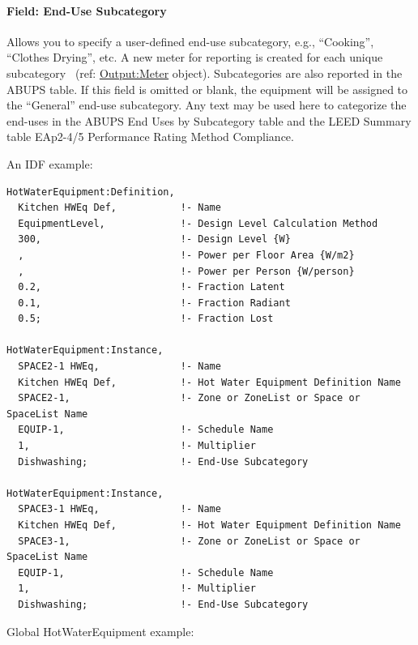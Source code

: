 \paragraph{Field: End-Use Subcategory}\label{field-end-use-subcategory-3-000-hw-instance}

Allows you to specify a user-defined end-use subcategory, e.g., ``Cooking'', ``Clothes Drying'', etc. A new meter for reporting is created for each unique subcategory~ (ref: \hyperref[outputmeter-and-outputmetermeterfileonly]{Output:Meter} object). Subcategories are also reported in the ABUPS table. If this field is omitted or blank, the equipment will be assigned to the ``General'' end-use subcategory. Any text may be used here to categorize the end-uses in the ABUPS End Uses by Subcategory table and the LEED Summary table EAp2-4/5 Performance Rating Method Compliance.

An IDF example:

\begin{lstlisting}
HotWaterEquipment:Definition,
  Kitchen HWEq Def,           !- Name
  EquipmentLevel,             !- Design Level Calculation Method
  300,                        !- Design Level {W}
  ,                           !- Power per Floor Area {W/m2}
  ,                           !- Power per Person {W/person}
  0.2,                        !- Fraction Latent
  0.1,                        !- Fraction Radiant
  0.5;                        !- Fraction Lost

HotWaterEquipment:Instance,
  SPACE2-1 HWEq,              !- Name
  Kitchen HWEq Def,           !- Hot Water Equipment Definition Name
  SPACE2-1,                   !- Zone or ZoneList or Space or SpaceList Name
  EQUIP-1,                    !- Schedule Name
  1,                          !- Multiplier
  Dishwashing;                !- End-Use Subcategory

HotWaterEquipment:Instance,
  SPACE3-1 HWEq,              !- Name
  Kitchen HWEq Def,           !- Hot Water Equipment Definition Name
  SPACE3-1,                   !- Zone or ZoneList or Space or SpaceList Name
  EQUIP-1,                    !- Schedule Name
  1,                          !- Multiplier
  Dishwashing;                !- End-Use Subcategory
\end{lstlisting}

Global HotWaterEquipment example:

